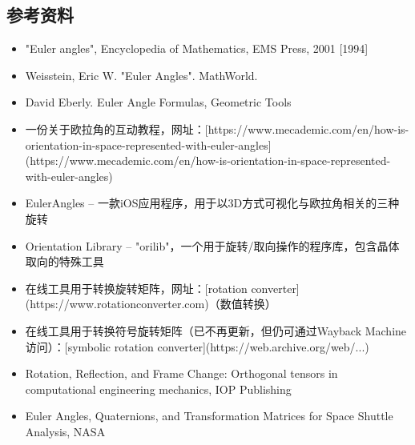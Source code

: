 \subsection{参考资料}
\begin{itemize}
\item "Euler angles", Encyclopedia of Mathematics, EMS Press, 2001 [1994]
\item Weisstein, Eric W. "Euler Angles". MathWorld.
\item David Eberly. Euler Angle Formulas, Geometric Tools
\item 一份关于欧拉角的互动教程，网址：[https://www.mecademic.com/en/how-is-orientation-in-space-represented-with-euler-angles](https://www.mecademic.com/en/how-is-orientation-in-space-represented-with-euler-angles)
\item EulerAngles – 一款iOS应用程序，用于以3D方式可视化与欧拉角相关的三种旋转
\item Orientation Library – "orilib"，一个用于旋转/取向操作的程序库，包含晶体取向的特殊工具
\item 在线工具用于转换旋转矩阵，网址：[rotation converter](https://www.rotationconverter.com)（数值转换）
\item 在线工具用于转换符号旋转矩阵（已不再更新，但仍可通过Wayback Machine访问）：[symbolic rotation converter](https://web.archive.org/web/...)
\item Rotation, Reflection, and Frame Change: Orthogonal tensors in computational engineering mechanics, IOP Publishing
\item Euler Angles, Quaternions, and Transformation Matrices for Space Shuttle Analysis, NASA
\end{itemize}